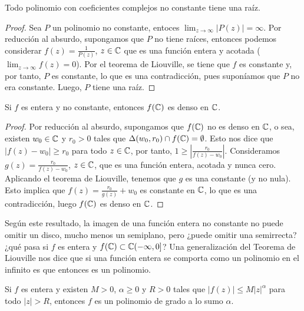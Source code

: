 \begin{teo}
    Todo polinomio con coeficientes complejos no constante tiene una raíz.
\end{teo}

\begin{proof}
    Sea $P$ un polinomio no constante, entoces $\lim_{z \to \infty}{|P(z)| = \infty}$. Por reducción al absurdo, supongamos que $P$ no tiene raíces, entonces podemos considerar $f(z) = \frac{1}{P(z)}$, $z \in \mathbb{C}$ que es una función entera y acotada ($\lim_{z \to \infty}{f(z)} = 0$). Por el teorema de Liouville, se tiene que $f$ es constante y, por tanto, $P$ es constante, lo que es una contradicción, pues suponíamos que $P$ no era constante. Luego, $P$ tiene una raíz.
\end{proof}

\begin{teo}[de Liouville]
    Si $f$ es entera y no constante, entonces $f(\mathbb{C})$ es denso en $\mathbb{C}$.
\end{teo}

\begin{proof}
    Por reducción al absurdo, supongamos que $f(\mathbb{C})$ no es denso en $\mathbb{C}$, o sea, existen $w_0 \in \mathbb{C}$ y $r_0 > 0$ tales que $\Delta(w_0,r_0) \cap f(\mathbb{C}) = \emptyset$. Esto nos dice que $|f(z) - w_0| \ge r_0$ para todo $z \in \mathbb{C}$, por tanto, $1 \ge \left| \frac{r_0}{f(z) - w_0} \right|$. Consideramos $g(z) = \frac{r_0}{f(z) - w_0}$, $z \in \mathbb{C}$, que es una función entera, acotada y nunca cero. Aplicando el teorema de Liouville, tenemos que $g$ es una constante (y no nula). Esto implica que $f(z) = \frac{r_0}{g(z)} + w_0$ es constante en $\mathbb{C}$, lo que es una contradicción, luego $f(\mathbb{C})$ es denso en $\mathbb{C}$.
\end{proof}

\begin{obs}
    Según este resultado, la imagen de una función entera no constante no puede omitir un disco, mucho menos un semiplano, pero ¿puede omitir una semirrecta? ¿qué pasa si $f$ es entera y $f(\mathbb{C}) \subset \mathbb{C} (-\infty,0]$? Una generalización del Teorema de Liouville nos dice que si una función entera se comporta como un polinomio en el infinito es que entonces es un polinomio.
\end{obs}

\begin{teo}[de Liouville]
    Si $f$ es entera y existen $M > 0$, $\alpha \ge 0$ y $R > 0$ tales que $|f(z)| \leq M|z|^{\alpha}$ para todo $|z| > R$, entonces $f$ es un polinomio de grado a lo sumo $\alpha$.
\end{teo}

